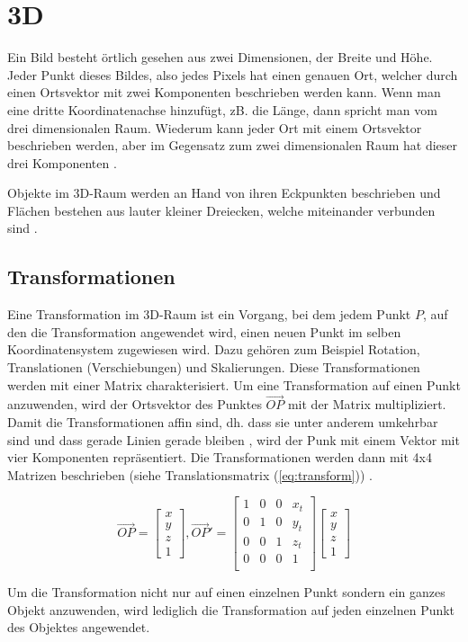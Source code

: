 \section{3D}

Ein Bild besteht örtlich gesehen aus zwei Dimensionen, der Breite und Höhe. Jeder Punkt dieses Bildes, also jedes Pixels hat einen genauen Ort, welcher durch einen Ortsvektor mit zwei Komponenten beschrieben werden kann. Wenn man eine dritte Koordinatenachse hinzufügt, zB. die Länge, dann spricht man vom drei dimensionalen Raum. Wiederum kann jeder Ort mit einem Ortsvektor beschrieben werden, aber im Gegensatz zum zwei dimensionalen Raum hat dieser drei Komponenten \cite{computergraphics:1}.

Objekte im 3D-Raum werden an Hand von ihren Eckpunkten beschrieben und Flächen bestehen aus lauter kleiner Dreiecken, welche miteinander verbunden sind \cite{computergraphics:1}.

\subsection{Transformationen}

Eine Transformation im 3D-Raum ist ein Vorgang, bei dem jedem Punkt $P$, auf den die Transformation angewendet wird, einen neuen Punkt im selben Koordinatensystem zugewiesen wird. Dazu gehören zum Beispiel Rotation, Translationen (Verschiebungen) und Skalierungen. Diese Transformationen werden mit einer Matrix charakterisiert. Um eine Transformation auf einen Punkt anzuwenden, wird der Ortsvektor des Punktes $\vec{OP}$ mit der Matrix multipliziert. Damit die Transformationen affin sind, dh. dass sie unter anderem umkehrbar sind und dass gerade Linien gerade bleiben \cite{affinetransformation:1}, wird der Punk mit einem Vektor mit vier Komponenten repräsentiert. Die Transformationen werden dann mit 4x4 Matrizen beschrieben (siehe  Translationsmatrix (\ref{eq:transform})) \cite{computergraphics:1}.

\begin{equation}
	\vec{OP} =
	\begin{bmatrix}
  	x \\
	y\\
	z\\
	1
	\end{bmatrix}
	, \vec{OP}' =
	\begin{bmatrix}
  	1 & 0 & 0 & x_t\\
	0 & 1 & 0 & y_t\\
	0 & 0 & 1 & z_t\\
	0 & 0 & 0 & 1\\
	\end{bmatrix}
	\begin{bmatrix}
  	x \\
	y\\
	z\\
	1
	\end{bmatrix}
	\label{eq:transform}
\end{equation}
\cite{computergraphics:1}

Um die Transformation nicht nur auf einen einzelnen Punkt sondern ein ganzes Objekt anzuwenden, wird lediglich die Transformation auf jeden einzelnen Punkt des Objektes angewendet.